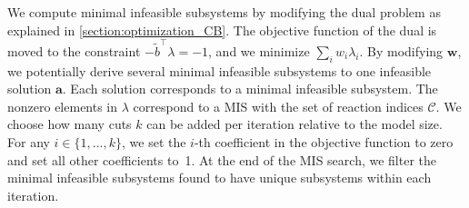
We compute minimal infeasible subsystems by modifying the dual problem as explained in \cref{section:optimization_CB}. %
The objective function of the dual is moved to the constraint $-\tilde{b}^\intercal \lambda = -1$, and we minimize $\sum_i w_i \lambda_i$. By modifying $\mathbf w$, we potentially derive several minimal infeasible subsystems to one infeasible solution $\boldsymbol a$. Each solution corresponds to a minimal infeasible subsystem. The nonzero elements in $\lambda$ correspond to a MIS with the set of reaction indices $\mathcal{C}$. We choose how many cuts $k$ can be added per iteration relative to the model size. For any $i \in \{1,...,k\}$, we set the $i$-th coefficient in the objective function to zero and set all other coefficients to~1. At the end of the MIS search, we filter the minimal infeasible subsystems found to have unique subsystems within each iteration.


